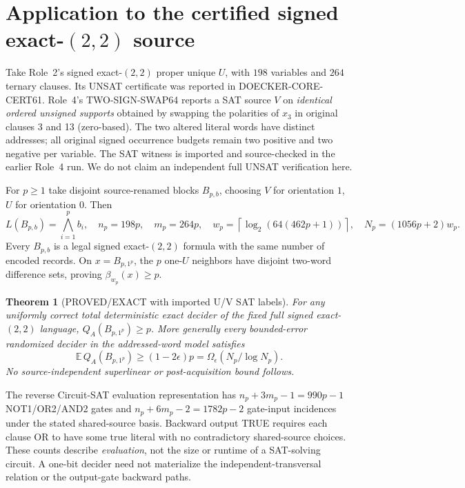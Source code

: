 \documentclass[11pt]{article}
\newtheorem{theorem}{Theorem}
\begin{document}
\section{Application to the certified signed exact-$(2,2)$ source}
Take Role~2's signed exact-$(2,2)$ proper unique $U$, with $198$ variables and $264$ ternary clauses. Its UNSAT certificate was reported in DOECKER-CORE-CERT61. Role~4's TWO-SIGN-SWAP64 reports a SAT source $V$ on \emph{identical ordered unsigned supports} obtained by swapping the polarities of $x_3$ in original clauses 3 and 13 (zero-based). The two altered literal words have distinct addresses; all original signed occurrence budgets remain two positive and two negative per variable. The SAT witness is imported and source-checked in the earlier Role~4 run. We do not claim an independent full UNSAT verification here.

For $p\ge1$ take disjoint source-renamed blocks $B_{p,b}$, choosing $V$ for orientation $1$, $U$ for orientation $0$. Then
\[
L(B_{p,b})=\bigwedge_{i=1}^p b_i,\quad
n_p=198p,\quad m_p=264p,\quad
w_p=\left\lceil\log_2(64(462p+1))\right\rceil,
\quad N_p=(1056p+2)w_p.
\]
Every $B_{p,b}$ is a legal signed exact-$(2,2)$ formula with the same number of encoded records. On $x=B_{p,1^p}$, the $p$ one-$U$ neighbors have disjoint two-word difference sets, proving $\beta_{w_p}(x)\ge p$.
\begin{theorem}[PROVED/EXACT with imported U/V SAT labels]
For any uniformly correct total deterministic exact decider of the fixed full signed exact-$(2,2)$ language, $Q_A(B_{p,1^p})\ge p$. More generally every bounded-error randomized decider in the addressed-word model satisfies
\[
\boxed{\mathbb E\,Q_A(B_{p,1^p})\ge(1-2\epsilon)p
=\Omega_\epsilon(N_p/\log N_p).}
\tag{2}
\]
No source-independent superlinear or post-acquisition bound follows.
\end{theorem}
The reverse Circuit-SAT evaluation representation has $n_p+3m_p-1=990p-1$ NOT1/OR2/AND2 gates and $n_p+6m_p-2=1782p-2$ gate-input incidences under the stated shared-source basis. Backward output TRUE requires each clause OR to have some true literal with no contradictory shared-source choices. These counts describe \emph{evaluation}, not the size or runtime of a SAT-solving circuit. A one-bit decider need not materialize the independent-transversal relation or the output-gate backward paths.
\end{document}
